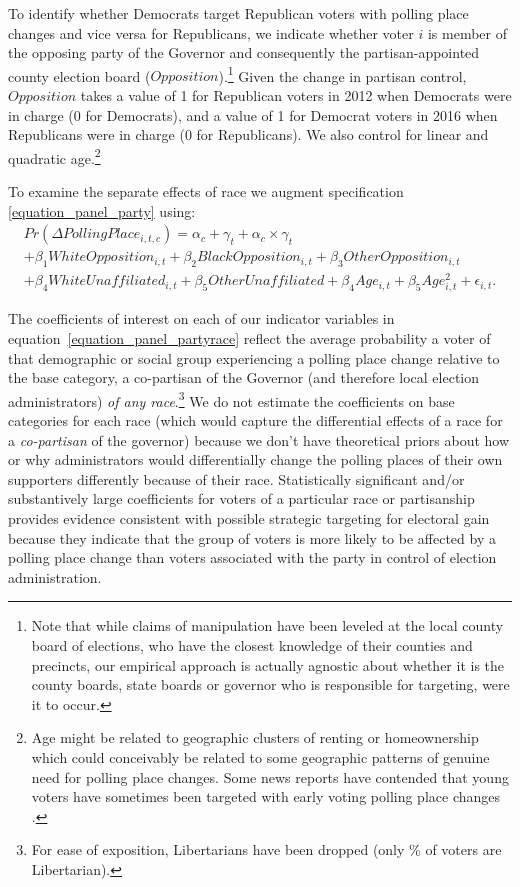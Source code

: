 \documentclass[12pt]{article}
\begin{document}
To identify whether Democrats target Republican voters with polling place changes and vice versa for Republicans, we indicate whether voter $i$ is member of the opposing party of the Governor and consequently the partisan-appointed county election board ($Opposition$).\footnote{Note that while claims of manipulation have been leveled at the local county board of elections, who have the closest knowledge of their counties and precincts, our empirical approach is actually agnostic about whether it is the county boards, state boards or governor who is responsible for targeting, were it to occur.} Given the change in partisan control, $Opposition$ takes a value of 1 for Republican voters in 2012 when Democrats were in charge (0 for Democrats), and a value of 1 for Democrat voters in 2016 when Republicans were in charge (0 for Republicans).  We also control for linear and quadratic age.\footnote{Age might be related to geographic clusters of renting or homeownership which could conceivably be related to some geographic patterns of genuine need for polling place changes.  Some news reports have contended that young voters have sometimes been targeted with early voting polling place changes \citep{roth2015x}.}

To examine the separate effects of race we augment specification \ref{equation_panel_party} using:
\begin{align}
   Pr(\Delta Polling Place_{i,t,c}) = \alpha_{c} + \gamma_{t} +  \alpha_{c}\times\gamma_{t}    \nonumber \\
    + \beta_1 WhiteOpposition_{i,t}  + \beta_2 BlackOpposition_{i,t} + \beta_3 OtherOpposition_{i,t}   \nonumber \\
  + \beta_4 WhiteUnaffiliated_{i,t}   + \beta_5 OtherUnaffiliated + \beta_{4}Age_{i,t} + \beta_{5}Age_{i,t}^{2}  + \epsilon_{i,t}. \label{equation_panel_partyrace}
\end{align}\normalsize

The coefficients of interest on each of our indicator variables in equation~\ref{equation_panel_partyrace} reflect the average probability a voter of that demographic or social group experiencing a polling place change relative to the base category, a co-partisan of the Governor (and therefore local election administrators) \emph{of any race}.\footnote{For ease of exposition, Libertarians have been dropped (only \unskip\% of voters are Libertarian).} We do not estimate the coefficients on base categories for each race (which would capture the differential effects of a race for a \emph{co-partisan} of the governor) because we don't have theoretical priors about how or why administrators would differentially change the polling places of their own supporters differently because of their race.  Statistically significant and/or substantively large coefficients for voters of a particular race or partisanship provides evidence consistent with possible strategic targeting for electoral gain because they indicate that the group of voters is more likely to be affected by a polling place change than voters associated with the party in control of election administration.
\end{document}
